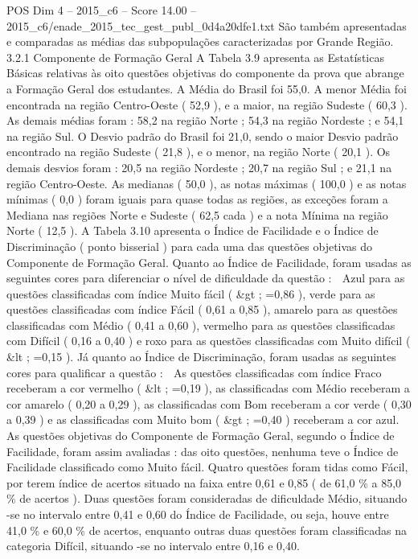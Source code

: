 \begin{textsample}{POS Dim 4 – 2015\_c6 – Score 14.00 – 2015\_c6/enade\_2015\_tec\_gest\_publ\_0d4a20dfe1.txt}
São também apresentadas e comparadas as médias das subpopulações caracterizadas por Grande Região. 3.2.1 Componente de Formação Geral A Tabela 3.9 apresenta as Estatísticas Básicas relativas às oito questões objetivas do componente da prova que abrange a Formação Geral dos estudantes.
A Média do Brasil foi 55,0.
A menor Média foi encontrada na região Centro-Oeste ( 52,9 ), e a maior, na região Sudeste ( 60,3 ).
As demais médias foram : 58,2 na região Norte ; 54,3 na região Nordeste ; e 54,1 na região Sul.
O Desvio padrão do Brasil foi 21,0, sendo o maior Desvio padrão encontrado na região Sudeste ( 21,8 ), e o menor, na região Norte ( 20,1 ).
Os demais desvios foram : 20,5 na região Nordeste ; 20,7 na região Sul ; e 21,1 na região Centro-Oeste.
As medianas ( 50,0 ), as notas máximas ( 100,0 ) e as notas mínimas ( 0,0 ) foram iguais para quase todas as regiões, as exceções foram a Mediana nas regiões Norte e Sudeste ( 62,5 cada ) e a nota Mínima na região Norte ( 12,5 ).
A Tabela 3.10 apresenta o Índice de Facilidade e o Índice de Discriminação ( ponto bisserial ) para cada uma das questões objetivas do Componente de Formação Geral.
Quanto ao Índice de Facilidade, foram usadas as seguintes cores para diferenciar o nível de dificuldade da questão :  Azul para as questões classificadas com índice Muito fácil ( \&gt ; =0,86 ), verde para as questões classificadas com índice Fácil ( 0,61 a 0,85 ), amarelo para as questões classificadas com Médio ( 0,41 a 0,60 ), vermelho para as questões classificadas com Difícil ( 0,16 a 0,40 ) e roxo para as questões classificadas com Muito difícil ( \&lt ; =0,15 ).
Já quanto ao Índice de Discriminação, foram usadas as seguintes cores para qualificar a questão :  As questões classificadas com índice Fraco receberam a cor vermelho ( \&lt ; =0,19 ), as classificadas com Médio receberam a cor amarelo ( 0,20 a 0,29 ), as classificadas com Bom receberam a cor verde ( 0,30 a 0,39 ) e as classificadas com Muito bom ( \&gt ; =0,40 ) receberam a cor azul.
As questões objetivas do Componente de Formação Geral, segundo o Índice de Facilidade, foram assim avaliadas : das oito questões, nenhuma teve o Índice de Facilidade classificado como Muito fácil.
Quatro questões foram tidas como Fácil, por terem índice de acertos situado na faixa entre 0,61 e 0,85 ( de 61,0 \% a 85,0 \% de acertos ).
Duas questões foram consideradas de dificuldade Médio, situando -se no intervalo entre 0,41 e 0,60 do Índice de Facilidade, ou seja, houve entre 41,0 \% e 60,0 \% de acertos, enquanto outras duas questões foram classificadas na categoria Difícil, situando -se no intervalo entre 0,16 e 0,40.

\end{textsample}
